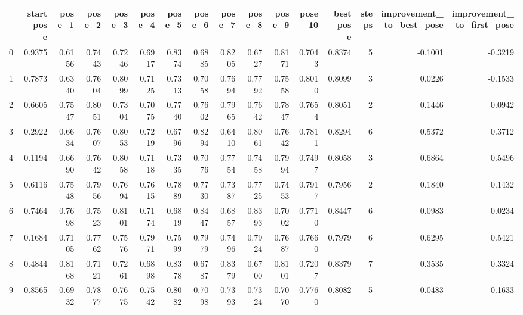 \begin{tabular}{lrrrrrrrrrrrrrrr}
\toprule
{} &  start\_pose &  pose\_1 &  pose\_2 &  pose\_3 &  pose\_4 &  pose\_5 &  pose\_6 &  pose\_7 &  pose\_8 &  pose\_9 &  pose\_10 &  best\_pose &  steps &  improvement\_to\_best\_pose &  improvement\_to\_first\_pose \\
\midrule
0   &      0.9375 &  0.6156 &  0.7443 &  0.7246 &  0.6917 &  0.8374 &  0.6885 &  0.8205 &  0.6727 &  0.8171 &   0.7043 &     0.8374 &      5 &                   -0.1001 &                    -0.3219 \\
1   &      0.7873 &  0.6340 &  0.7604 &  0.8099 &  0.7125 &  0.7313 &  0.7058 &  0.7694 &  0.7792 &  0.7558 &   0.8010 &     0.8099 &      3 &                    0.0226 &                    -0.1533 \\
2   &      0.6605 &  0.7547 &  0.8051 &  0.7304 &  0.7075 &  0.7740 &  0.7602 &  0.7965 &  0.7642 &  0.7847 &   0.7654 &     0.8051 &      2 &                    0.1446 &                     0.0942 \\
3   &      0.2922 &  0.6634 &  0.7607 &  0.8053 &  0.7219 &  0.6796 &  0.8294 &  0.6410 &  0.8061 &  0.7642 &   0.7811 &     0.8294 &      6 &                    0.5372 &                     0.3712 \\
4   &      0.1194 &  0.6690 &  0.7642 &  0.8058 &  0.7118 &  0.7335 &  0.7076 &  0.7754 &  0.7458 &  0.7994 &   0.7497 &     0.8058 &      3 &                    0.6864 &                     0.5496 \\
5   &      0.6116 &  0.7548 &  0.7956 &  0.7694 &  0.7615 &  0.7889 &  0.7730 &  0.7387 &  0.7725 &  0.7453 &   0.7917 &     0.7956 &      2 &                    0.1840 &                     0.1432 \\
6   &      0.7464 &  0.7698 &  0.7523 &  0.8101 &  0.7174 &  0.6819 &  0.8447 &  0.6857 &  0.8393 &  0.7002 &   0.7710 &     0.8447 &      6 &                    0.0983 &                     0.0234 \\
7   &      0.1684 &  0.7105 &  0.7762 &  0.7576 &  0.7971 &  0.7599 &  0.7979 &  0.7496 &  0.7924 &  0.7687 &   0.7660 &     0.7979 &      6 &                    0.6295 &                     0.5421 \\
8   &      0.4844 &  0.8168 &  0.7121 &  0.7261 &  0.6898 &  0.8378 &  0.6787 &  0.8379 &  0.6700 &  0.8101 &   0.7207 &     0.8379 &      7 &                    0.3535 &                     0.3324 \\
9   &      0.8565 &  0.6932 &  0.7877 &  0.7675 &  0.7542 &  0.8082 &  0.7098 &  0.7393 &  0.7324 &  0.7070 &   0.7760 &     0.8082 &      5 &                   -0.0483 &                    -0.1633 \\

\end{tabular}

